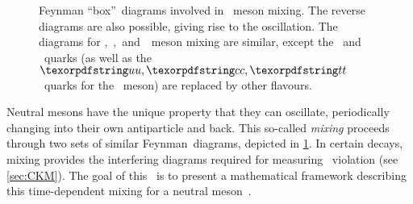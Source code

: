 \begin{figure}[b]
    \caption{
        Feynman ``box''~diagrams involved in \Bs~meson mixing.
        The reverse diagrams are also possible, giving rise to the oscillation.
        The diagrams for \Kz,~\Dz,~and~\Bd~meson mixing are similar, except the \bquark~and \squark~quarks (as well as the \({\uquark, \cquark, \tquark}\)~quarks for the \Dz~meson) are replaced by other flavours.}
    \label{fig:theory_Mixing}
\end{figure}
%
Neutral mesons have the unique property that they can oscillate, periodically changing into their own antiparticle and back.
This so-called \emph{mixing} proceeds through two sets of similar Feynman~diagrams, depicted in \cref{fig:theory_Mixing}.
In certain decays, mixing provides the interfering diagrams required for measuring \CP~violation (see \cref{sec:CKM}).
The goal of this~ is to present a mathematical framework describing this time-dependent mixing for a neutral meson~\PP.


